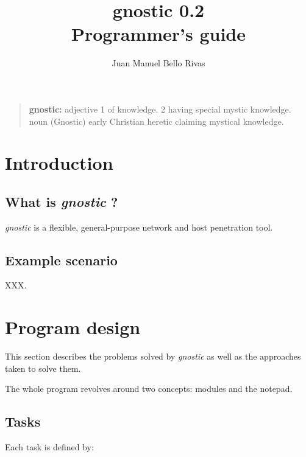 \documentclass[a4paper,12pt]{book}
\newcommand{\gnostic}{\emph{gnostic} }
\begin{document}
\title{gnostic 0.2\\Programmer's guide}
\author{Juan Manuel Bello Rivas}
\maketitle

\pagebreak

\begin{quotation}
\textbf{gnostic:} adjective 1 of knowledge. 2 having special mystic knowledge.
noun (Gnostic) early Christian heretic claiming mystical knowledge.
\end{quotation}

\pagebreak

\tableofcontents

\pagebreak

\chapter{Introduction}

\section{What is \gnostic?}

\gnostic is a flexible, general-purpose network and host penetration tool.

\section{Example scenario}

XXX.

\chapter{Program design}

This section describes the problems solved by \gnostic as well as the
approaches taken to solve them.

The whole program revolves around two concepts: modules and the notepad.

\section{Tasks}

Each task is defined by:
\end{document}
